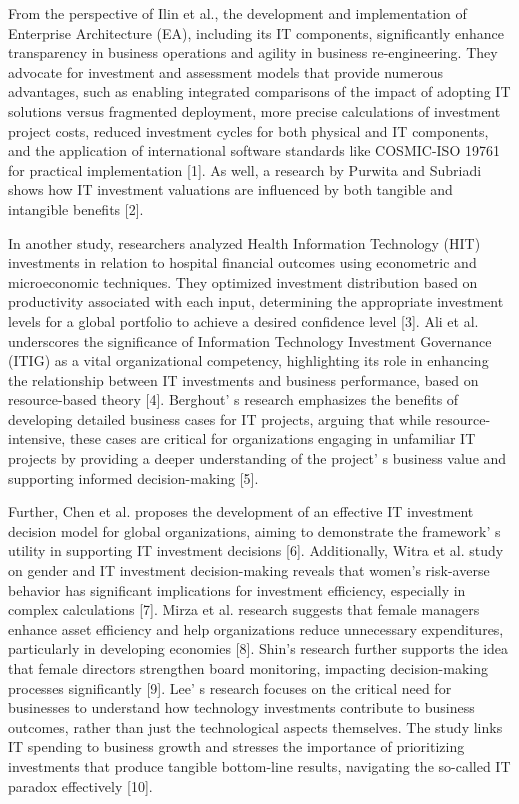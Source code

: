 \begin{multicols}{2}
From the perspective of Ilin et al., the development and implementation
of Enterprise Architecture (EA), including its IT components,
significantly enhance transparency in business operations and agility in
business re-engineering. They advocate for investment and assessment
models that provide numerous advantages, such as enabling integrated
comparisons of the impact of adopting IT solutions versus fragmented
deployment, more precise calculations of investment project costs,
reduced investment cycles for both physical and IT components, and the
application of international software standards like COSMIC-ISO 19761
for practical implementation {[}1{]}. As well, a research by Purwita and
Subriadi shows how IT investment valuations are influenced by both
tangible and intangible benefits {[}2{]}.

In another study, researchers analyzed Health Information Technology
(HIT) investments in relation to hospital financial outcomes using
econometric and microeconomic techniques. They optimized investment
distribution based on productivity associated with each input,
determining the appropriate investment levels for a global portfolio to
achieve a desired confidence level {[}3{]}. Ali et al. underscores the
significance of Information Technology Investment Governance (ITIG) as a
vital organizational competency, highlighting its role in enhancing the
relationship between IT investments and business performance, based on
resource-based theory {[}4{]}. Berghout' s research
emphasizes the benefits of developing detailed business cases for IT
projects, arguing that while resource-intensive, these cases are
critical for organizations engaging in unfamiliar IT projects by
providing a deeper understanding of the project' s
business value and supporting informed decision-making {[}5{]}.

Further, Chen et al. proposes the development of an effective IT
investment decision model for global organizations, aiming to
demonstrate the framework' s utility in supporting IT
investment decisions {[}6{]}. Additionally, Witra et al. study on gender
and IT investment decision-making reveals that women's risk-averse
behavior has significant implications for investment efficiency,
especially in complex calculations {[}7{]}. Mirza et al. research
suggests that female managers enhance asset efficiency and help
organizations reduce unnecessary expenditures, particularly in
developing economies {[}8{]}. Shin's research further supports the idea
that female directors strengthen board monitoring, impacting
decision-making processes significantly {[}9{]}. Lee' s
research focuses on the critical need for businesses to understand how
technology investments contribute to business outcomes, rather than just
the technological aspects themselves. The study links IT spending to
business growth and stresses the importance of prioritizing investments
that produce tangible bottom-line results, navigating the so-called IT
paradox effectively {[}10{]}.


\end{multicols}
